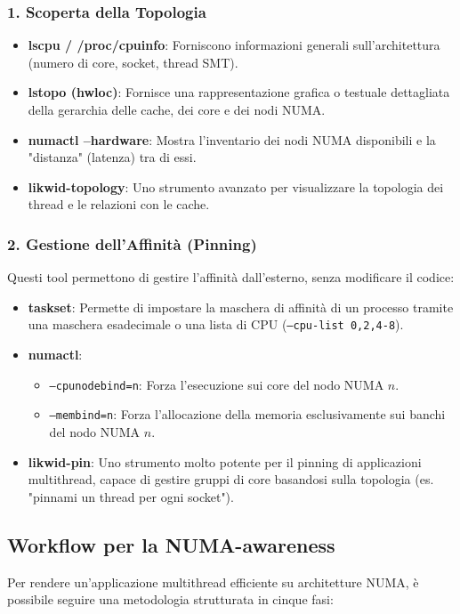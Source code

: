 \subsubsection*{1. Scoperta della Topologia}
\begin{itemize}
    \item \textbf{lscpu / /proc/cpuinfo}: Forniscono informazioni generali sull'architettura (numero di core, socket, thread SMT).
    \item \textbf{lstopo (hwloc)}: Fornisce una rappresentazione grafica o testuale dettagliata della gerarchia delle cache, dei core e dei nodi NUMA.
    \item \textbf{numactl --hardware}: Mostra l'inventario dei nodi NUMA disponibili e la "distanza" (latenza) tra di essi.
    \item \textbf{likwid-topology}: Uno strumento avanzato per visualizzare la topologia dei thread e le relazioni con le cache.
\end{itemize}

\subsubsection*{2. Gestione dell'Affinità (Pinning)}
Questi tool permettono di gestire l'affinità dall'esterno, senza modificare il codice:
\begin{itemize}
    \item \textbf{taskset}: Permette di impostare la maschera di affinità di un processo tramite una maschera esadecimale o una lista di CPU (\texttt{--cpu-list 0,2,4-8}).
    \item \textbf{numactl}:
    \begin{itemize}
        \item \texttt{--cpunodebind=n}: Forza l'esecuzione sui core del nodo NUMA $n$.
        \item \texttt{--membind=n}: Forza l'allocazione della memoria esclusivamente sui banchi del nodo NUMA $n$.
    \end{itemize}
    \item \textbf{likwid-pin}: Uno strumento molto potente per il pinning di applicazioni multithread, capace di gestire gruppi di core basandosi sulla topologia (es. "pinnami un thread per ogni socket").
\end{itemize}
\subsection{Workflow per la NUMA-awareness}
Per rendere un'applicazione multithread efficiente su architetture NUMA, è possibile seguire una metodologia strutturata in cinque fasi:

